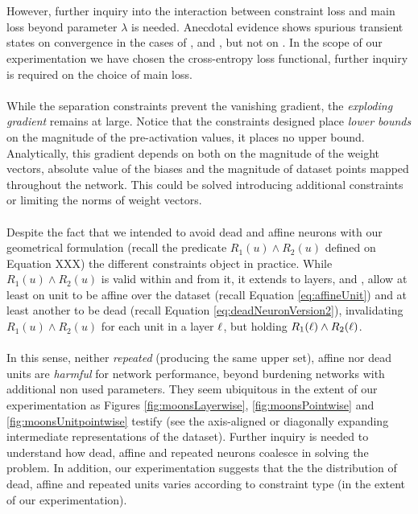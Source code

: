 \\\\
However, further inquiry into the interaction between constraint loss and main loss beyond parameter $\lambda$ is needed. Anecdotal evidence shows spurious transient states on convergence in the cases of \SepPoint, \SepUnit and \SepUnitPoint, but not on \SepLayer.  In the scope of our experimentation we have chosen the cross-entropy loss functional, further inquiry is required on the choice of main loss. 
\\\\
While the separation constraints prevent the vanishing gradient, the \emph{exploding gradient} remains at large. Notice that the constraints designed place \emph{lower bounds} on the magnitude of the pre-activation values, it places no upper bound. Analytically, this gradient depends on both on the magnitude of the weight vectors, absolute value of the biases and  the magnitude of dataset points mapped throughout the network. This could be solved introducing additional constraints or limiting the norms of weight vectors. 
\\\\
Despite the fact that we intended to avoid dead and affine neurons with our geometrical formulation (recall the predicate $R_1(u) \wedge R_2(u)$ defined on Equation XXX) the different constraints  object in practice. While $R_1(u) \wedge R_2(u)$ is valid within \SepUnit and from it, it extends to layers, \SepLayer and \SepPoint,  allow at least on unit to be affine  over the dataset (recall Equation \ref{eq:affineUnit}) and at least another to be dead (recall Equation \ref{eq:deadNeuronVersion2}), invalidating $R_1(u) \wedge R_2(u)$ for each unit in a layer $\ell$, but holding $R_1(\ell) \wedge R_2(\ell)$. 
\\\\
In this sense, neither \emph{repeated} (producing the same upper set), affine nor dead units are \emph{harmful} for network performance, beyond burdening networks with additional non used parameters. They seem ubiquitous in the extent of our experimentation as Figures \ref{fig:moonsLayerwise}, \ref{fig:moonsPointwise} and \ref{fig:moonsUnitpointwise} testify (see the axis-aligned or diagonally expanding intermediate representations of the dataset). Further inquiry is needed to understand how dead, affine and repeated neurons coalesce in solving the problem. In addition, our experimentation suggests that the  the distribution of dead, affine and repeated units varies according to constraint type (in the extent of our experimentation). 
